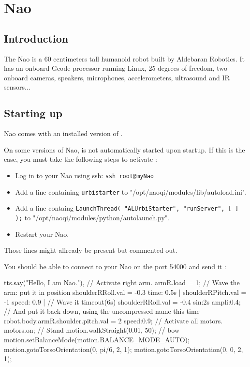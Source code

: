 \newcommand{\naoqi}{NaoQi\xspace}

\chapter{Nao}
\label{sec:nao}
\section{Introduction}

The Nao is a 60 centimeters tall humanoid robot built by Aldebaran Robotics.
It has an onboard Geode processor running Linux, 25 degrees of freedom,
two onboard cameras, speakers, microphones, accelerometers, ultrasound and IR
sensors...

\section{Starting up}

Nao comes with an installed version of \urbi.

On some versions of Nao, \urbi is not automatically started upon startup.
If this is the case, you must take the following steps to activate \urbi:

\begin{itemize}
\item Log in to your Nao using ssh: \lstinline|ssh root@myNao|
\item Add a line containing \lstinline|urbistarter| to
"/opt/naoqi/modules/lib/autoload.ini".
\item Add a line containg
\lstinline|LaunchThread( "ALUrbiStarter", "runServer", [ ] );| to "/opt/naoqi/modules/python/autolaunch.py".
\item Restart your Nao.
\end{itemize}

Those lines might allready be present but commented out.

You should be able to connect to your Nao on the port 54000 and send it \us:

\begin{urbifixme}
tts.say("Hello, I am Nao."),
// Activate right arm.
armR.load = 1;
// Wave the arm: put it in position
shoulderRRoll.val = -0.3 time: 0.5s |
shoulderRPitch.val = -1 speed: 0.9 |
// Wave it
timeout(6s) shoulderRRoll.val = -0.4 sin:2s ampli:0.4;
// And put it back down, using the uncompressed name this time
robot.body.armR.shoulder.pitch.val = 2 speed:0.9;
// Activate all motors.
motors.on;
// Stand
motion.walkStraight(0.01, 50);
// bow
motion.setBalanceMode(motion.BALANCE_MODE_AUTO);
motion.gotoTorsoOrientation(0, pi/6, 2, 1);
motion.gotoTorsoOrientation(0, 0, 2, 1);
\end{urbifixme}

